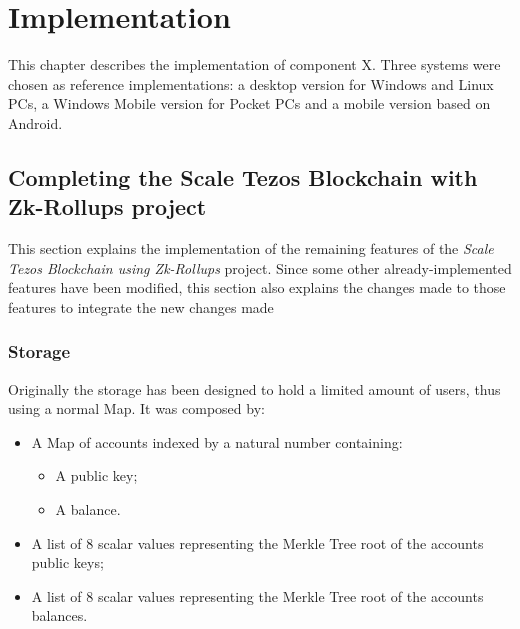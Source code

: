 \chapter{Implementation\label{cha:chapter5}}

This chapter describes the implementation of component X. Three systems were chosen as reference implementations: a desktop version for Windows and Linux PCs, a Windows Mobile version for Pocket PCs and a mobile version based on Android. 

\section{Completing the Scale Tezos Blockchain with Zk-Rollups project}
This section explains the implementation of the remaining features of the \textit{Scale Tezos Blockchain using Zk-Rollups} project. Since some other already-implemented features have been modified, this section also explains the changes made to those features to integrate the new changes made

\subsection{Storage}

Originally the storage has been designed to hold a limited amount of users, thus using a normal Map. It was composed by:
\begin{itemize}
	\item A Map of accounts indexed by a natural number containing:
		\begin{itemize}
			\item A public key;
			\item A balance.
		\end{itemize}
	\item A list of 8 scalar values representing the Merkle Tree root of the accounts public keys;
	\item A list of 8 scalar values representing the Merkle Tree root of the accounts balances.
\end{itemize}

